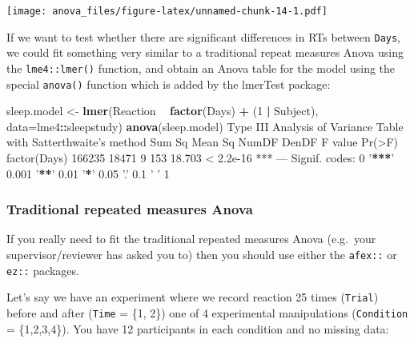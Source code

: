 \documentclass[]{article}
\newenvironment{Shaded}{\begin{snugshade}}{\end{snugshade}}
\newcommand{\DataTypeTok}[1]{\textcolor[rgb]{0.13,0.29,0.53}{#1}}
\newcommand{\DecValTok}[1]{\textcolor[rgb]{0.00,0.00,0.81}{#1}}
\newcommand{\ErrorTok}[1]{\textcolor[rgb]{0.64,0.00,0.00}{\textbf{#1}}}
\newcommand{\KeywordTok}[1]{\textcolor[rgb]{0.13,0.29,0.53}{\textbf{#1}}}
\newcommand{\NormalTok}[1]{#1}
\newcommand{\OperatorTok}[1]{\textcolor[rgb]{0.81,0.36,0.00}{\textbf{#1}}}
\newcommand{\StringTok}[1]{\textcolor[rgb]{0.31,0.60,0.02}{#1}}
\begin{document}
\texttt{[image: anova\_files/figure-latex/unnamed-chunk-14-1.pdf]}

If we want to test whether there are significant differences in RTs between
\texttt{Days}, we could fit something very similar to a traditional repeat measures
Anova using the \texttt{lme4::lmer()} function, and obtain an Anova table for the model
using the special \texttt{anova()} function which is added by the lmerTest package:

\begin{Shaded}
\begin{Highlighting}[]
\NormalTok{sleep.model <-}\StringTok{ }\KeywordTok{lmer}\NormalTok{(Reaction }\OperatorTok{~}\StringTok{ }\KeywordTok{factor}\NormalTok{(Days) }\OperatorTok{+}\StringTok{ }\NormalTok{(}\DecValTok{1} \OperatorTok{|}\StringTok{ }\NormalTok{Subject), }\DataTypeTok{data=}\NormalTok{lme4}\OperatorTok{::}\NormalTok{sleepstudy)}
\KeywordTok{anova}\NormalTok{(sleep.model)}
\NormalTok{Type III Analysis of Variance Table with Satterthwaite}\StringTok{'s method}
\StringTok{             Sum Sq Mean Sq NumDF DenDF F value    Pr(>F)    }
\StringTok{factor(Days) 166235   18471     9   153  18.703 < 2.2e-16 ***}
\StringTok{---}
\StringTok{Signif. codes:  0 '}\OperatorTok{**}\ErrorTok{*}\StringTok{' 0.001 '}\OperatorTok{**}\StringTok{' 0.01 '}\OperatorTok{*}\StringTok{' 0.05 '}\NormalTok{.}\StringTok{' 0.1 '} \StringTok{' 1}
\end{Highlighting}
\end{Shaded}

\hypertarget{trad-rm-anova}{%
\subsubsection*{Traditional repeated measures Anova}\label{trad-rm-anova}}

If you really need to fit the traditional repeated measures Anova (e.g.~your
supervisor/reviewer has asked you to) then you should use either the \texttt{afex::} or
\texttt{ez::} packages.

Let's say we have an experiment where we record reaction 25 times (\texttt{Trial})
before and after (\texttt{Time} = \{1, 2\}) one of 4 experimental manipulations
(\texttt{Condition} = \{1,2,3,4\}). You have 12 participants in each condition and no
missing data:

\begin{Shaded}
\end{Shaded}
\end{document}
